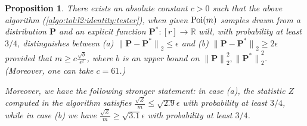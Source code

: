 \documentclass[11pt]{article}
\newtheorem{proposition}[theorem]{Proposition}
\theoremstyle{definition}
\newcommand{\R}{\mathbb{R}}
\newcommand{\p}{\mathbf{P}}
\newcommand{\eps}{\epsilon}
\newcommand{\norm}[1]{\lVert#1\rVert}
\newcommand{\Poi}{\mathop{\textnormal{Poi}}\nolimits}
\newcommand{\normtwo}[1]{{\norm{#1}}_2}
\begin{document}
\begin{proposition}\label{prop:l2:identity:tester}
There exists an absolute constant $c > 0$ such that the above algorithm (\cref{algo:tol:l2:identity:tester}), when given $\Poi(m)$ samples drawn from a distribution $\p$ and an explicit function $\p^\ast\colon[r]\to\R$ will, with probability at least $3/4$, 
distinguishes between \textsf{(a)} $\normtwo{ \p-\p^\ast } \leq \eps$ and \textsf{(b)} $\normtwo{ \p-\p^\ast } \geq 2\eps$ provided that $m \geq c\frac{\sqrt{b}}{\eps^2}$, where $b$ is an upper bound on $\normtwo{ \p }^2, \normtwo{ \p^\ast }^2$. (Moreover, one can take $c = 61$.)

Moreover, we have the following stronger statement: in case (a), the statistic $Z$ computed in the algorithm satisfies $\frac{\sqrt{Z}}{m} \leq \sqrt{2.9}\eps$ with probability at least $3/4$, while in case (b) we have $\frac{\sqrt{Z}}{m} \geq \sqrt{3.1}\eps$ with probability at least $3/4$.
\end{proposition}
\end{document}
